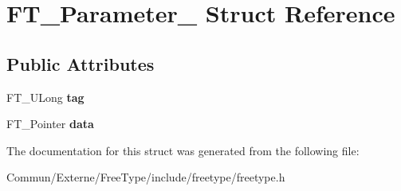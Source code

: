 \hypertarget{struct_f_t___parameter__}{}\section{F\+T\+\_\+\+Parameter\+\_\+ Struct Reference}
\label{struct_f_t___parameter__}
\subsection*{Public Attributes}
\begin{DoxyCompactItemize}
\item 
F\+T\+\_\+\+U\+Long {\bfseries tag}\hypertarget{struct_f_t___parameter___a5a53ef2652683a2cd9ee6a0a694cb76b}{}\label{struct_f_t___parameter___a5a53ef2652683a2cd9ee6a0a694cb76b}

\item 
F\+T\+\_\+\+Pointer {\bfseries data}\hypertarget{struct_f_t___parameter___a930c8885bd25be8d054443153c817c13}{}\label{struct_f_t___parameter___a930c8885bd25be8d054443153c817c13}

\end{DoxyCompactItemize}


The documentation for this struct was generated from the following file\+:\begin{DoxyCompactItemize}
\item 
Commun/\+Externe/\+Free\+Type/include/freetype/freetype.\+h\end{DoxyCompactItemize}

